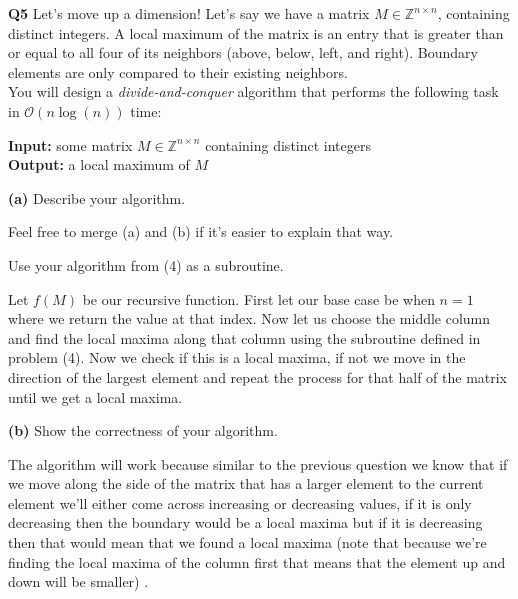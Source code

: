 \documentclass[12pt]{article}
\newcommand{\question}[3][Q]{
\begin{description}
\item \textbf{#1{#2}} #3
\end{description}
}
\newcommand{\hint}[1]{{\footnotesize
    \begin{description}
    [leftmargin=3.3em,style=nextline]
        \item[Hint:] {#1}
    \end{description}}   
}
\newcommand{\note}[1]{{\footnotesize
    \begin{description}
    [leftmargin=3.4em,style=nextline]
        \item[Note:] {#1}
    \end{description}}   
}
\newcommand{\Z}{\mathbb{Z}}
\begin{document}
\newpage
\question{5}{
    Let's move up a dimension! Let's say we have a matrix $M \in \Z^{n\times n}$, containing distinct integers. A local maximum of the matrix is an entry that is greater than or equal to all four of its neighbors (above, below, left, and right). Boundary elements are only compared to their existing neighbors.\\

    You will design a \textit{divide-and-conquer} algorithm that performs the following task in $\mathcal{O}(n\log(n))$ time:
    
    \textbf{Input:} some matrix $M \in \Z^{n \times n}$ containing distinct integers\\
    \textbf{Output:} a local maximum of $M$
}
\question[]{(a)}{
    Describe your algorithm.
    \note{Feel free to merge (a) and (b) if it's easier to explain that way.}
    \hint{Use your algorithm from (4) as a subroutine.}
}
\begin{answer}
    Let $f(M)$ be our recursive function. First let our base case be when $n = 1$ where we return the value at that index. Now let us choose the middle column and find the local maxima along that column using the subroutine defined in problem (4). Now we check if this is a local maxima, if not we move in the direction of the largest element and repeat the process for that half of the matrix until we get a local maxima.

     
\end{answer}

\question[]{(b)}{
    Show the correctness of your algorithm.
}
\begin{answer}
    The algorithm will work because similar to the previous question we know that if we move along the side of the matrix that has a larger element to the current element we'll either come across increasing or decreasing values, if it is only decreasing then the boundary would be a local maxima but if it is decreasing then that would mean that we found a local maxima (note that because we're finding the local maxima of the column first that means that the element up and down will be smaller) .
\end{answer}
\end{document}
